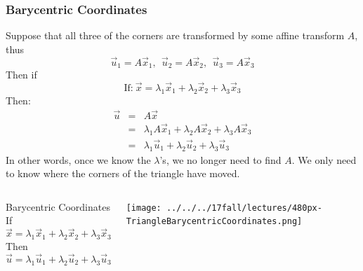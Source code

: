 \documentclass{beamer}
\begin{document}
\begin{frame}
  \frametitle{Barycentric Coordinates}
  Suppose that all three of the corners are 
  transformed by some affine transform $A$, thus
  \[
  \vec{u}_1=A\vec{x}_1,~~
  \vec{u}_2=A\vec{x}_2,~~
  \vec{u}_3=A\vec{x}_3
  \]
  Then if
  \[
  \mbox{If:}~\vec{x}=\lambda_1\vec{x}_1+\lambda_2\vec{x}_2+\lambda_3\vec{x}_3
  \]
  Then:
  \begin{eqnarray*}
    \vec{u} &=& A\vec{x}\\
    &=& \lambda_1A\vec{x}_1+\lambda_2A\vec{x}_2+\lambda_3A\vec{x}_3\\
    &=& \lambda_1\vec{u}_1+\lambda_2\vec{u}_2+\lambda_3\vec{u}_3
  \end{eqnarray*}
  In other words, once we know the $\lambda$'s, we no longer need to
  find $A$.  We only need to know where the corners of the triangle
  have moved.
\end{frame}

\begin{frame}
  \begin{columns}[t]
    \column{2.5in}
    \begin{block}{Barycentric Coordinates}
      If
      \[
      \vec{x}=\lambda_1\vec{x}_1+\lambda_2\vec{x}_2+\lambda_3\vec{x}_3
      \]
      Then
      \[
      \vec{u}= \lambda_1\vec{u}_1+\lambda_2\vec{u}_2+\lambda_3\vec{u}_3
      \]
    \end{block}
    \column{2.25in}
    \begin{block}{}
      \centerline{\texttt{[image: ../../../17fall/lectures/480px-TriangleBarycentricCoordinates.png]}}
    \end{block}
  \end{columns}
\end{frame}
\end{document}
